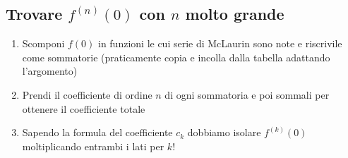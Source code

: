 \documentclass[10pt, a4paper]{article}
\begin{document}
    \subsection{Trovare $f^{(n)}(0)$ con $n$ molto grande}
        \begin{enumerate}
            \item Scomponi $f(0)$ in funzioni le cui serie di McLaurin sono note e riscrivile come sommatorie (praticamente copia e incolla dalla tabella adattando l'argomento)
            \item Prendi il coefficiente di ordine $n$ di ogni sommatoria e poi sommali per ottenere il coefficiente totale
            \item Sapendo la formula del coefficiente $c_k$ dobbiamo isolare $f^{(k)}(0)$ moltiplicando entrambi i lati per $k!$
        \end{enumerate}
\end{document}
